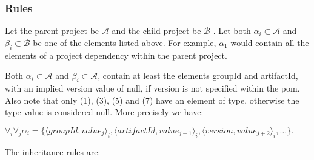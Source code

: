 \documentclass[12pt]{amsart}
\begin{document}
\subsubsection{Rules}
Let the parent project be \begin{math}\mathcal{A}\end{math} and the child project be  \begin{math}\mathcal{B}\end{math} . Let both \begin{math}\alpha_i \subset \mathcal{A}\end{math} and \begin{math}\beta_i \subset \mathcal{B}\end{math} be one of the elements listed above. For example,  \begin{math}\alpha_1\end{math} would contain all the elements of a project dependency within the parent project.

Both \begin{math}\alpha_i \subset \mathcal{A}\end{math} and \begin{math}\beta_i \subset \mathcal{A}\end{math}, contain at least the elements groupId and artifactId, with an implied version value of null, if version is not specified within the pom. Also note that only (1), (3), (5) and (7) have an element of type, otherwise the type value is considered null. More precisely we have:

\begin{math} \forall_i  \forall_j \alpha_i = \{\langle groupId, value_j \rangle_i, \langle artifactId, value_{j+1}\rangle_i, \langle version, value_{j+2}\rangle_i, \ldots\}.\end{math}

The inheritance rules are:
\end{document}
